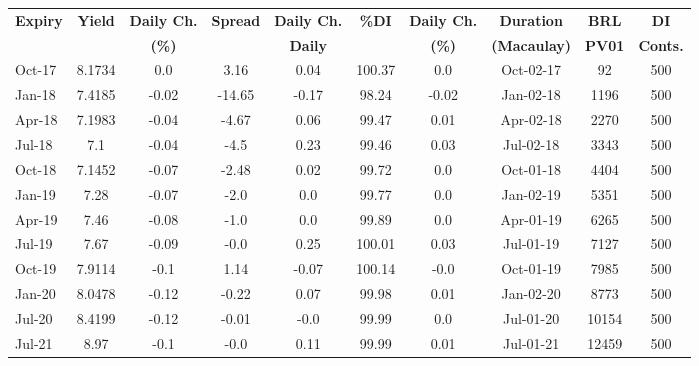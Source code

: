 \documentclass[article,crop=false]{standalone}%
\begin{document}
%
\normalsize%
\setlength{\tabcolsep}{0.15cm}%
\begin{tabular}[h]{l|c c|c c|c c|c c c}%
\hline%
\rowcolor{white}%
\textbf{Expiry}&\textbf{Yield}&\textbf{Daily Ch.}&\textbf{Spread}&\textbf{Daily Ch.}&\textbf{\%DI}&\textbf{Daily Ch.}&\textbf{Duration}&\textbf{BRL}&\textbf{DI}\\%
\rowcolor{white}%
\textbf{}&\textbf{}&\textbf{(\%)}&\textbf{}&\textbf{Daily}&\textbf{}&\textbf{(\%)}&\textbf{(Macaulay)}&\textbf{PV01}&\textbf{Conts.}\\%
\hline%
\rowcolor{lightgray}%
Oct{-}17&8.1734&0.0&3.16&0.04&100.37&0.0&Oct{-}02{-}17&92&500\\%
\rowcolor{white}%
Jan{-}18&7.4185&{-}0.02&{-}14.65&{-}0.17&98.24&{-}0.02&Jan{-}02{-}18&1196&500\\%
\rowcolor{lightgray}%
Apr{-}18&7.1983&{-}0.04&{-}4.67&0.06&99.47&0.01&Apr{-}02{-}18&2270&500\\%
\rowcolor{white}%
Jul{-}18&7.1&{-}0.04&{-}4.5&0.23&99.46&0.03&Jul{-}02{-}18&3343&500\\%
\rowcolor{lightgray}%
Oct{-}18&7.1452&{-}0.07&{-}2.48&0.02&99.72&0.0&Oct{-}01{-}18&4404&500\\%
\rowcolor{white}%
Jan{-}19&7.28&{-}0.07&{-}2.0&0.0&99.77&0.0&Jan{-}02{-}19&5351&500\\%
\rowcolor{lightgray}%
Apr{-}19&7.46&{-}0.08&{-}1.0&0.0&99.89&0.0&Apr{-}01{-}19&6265&500\\%
\rowcolor{white}%
Jul{-}19&7.67&{-}0.09&{-}0.0&0.25&100.01&0.03&Jul{-}01{-}19&7127&500\\%
\rowcolor{lightgray}%
Oct{-}19&7.9114&{-}0.1&1.14&{-}0.07&100.14&{-}0.0&Oct{-}01{-}19&7985&500\\%
\rowcolor{white}%
Jan{-}20&8.0478&{-}0.12&{-}0.22&0.07&99.98&0.01&Jan{-}02{-}20&8773&500\\%
\rowcolor{lightgray}%
Jul{-}20&8.4199&{-}0.12&{-}0.01&{-}0.0&99.99&0.0&Jul{-}01{-}20&10154&500\\%
\rowcolor{white}%
Jul{-}21&8.97&{-}0.1&{-}0.0&0.11&99.99&0.01&Jul{-}01{-}21&12459&500\\%
\hline%
\end{tabular}%
\end{document}
